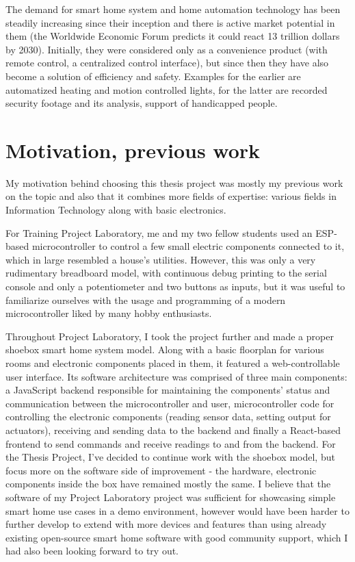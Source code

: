 The demand for smart home system and home automation technology has been steadily increasing since their inception and there is active market potential in them (the Worldwide Economic Forum predicts it could react 13 trillion dollars by 2030). Initially, they were considered only as a convenience product (with remote control, a centralized control interface), but since then they have also become a solution of efficiency and safety. Examples for the earlier are automatized heating and motion controlled lights, for the latter are recorded security footage and its analysis, support of handicapped people. \cite{ChakSHS}


\section{Motivation, previous work}
My motivation behind choosing this thesis project was mostly my previous work on the topic and also that it combines more fields of expertise: various fields in Information Technology along with basic electronics.\break

For Training Project Laboratory, me and my two fellow students used an ESP-based microcontroller to control a few small electric components connected to it, which in large resembled a house's utilities. However, this was only a very rudimentary breadboard model, with continuous debug printing to the serial console and only a potentiometer and two buttons as inputs, but it was useful to familiarize ourselves with the usage and programming of a modern microcontroller liked by many hobby enthusiasts.\break

Throughout Project Laboratory, I took the project further and made a proper shoebox smart home system model. Along with a basic floorplan for various rooms and electronic components placed in them, it featured a web-controllable user interface. Its software architecture was comprised of three main components: a JavaScript backend responsible for maintaining the components' status and communication between the microcontroller and user, microcontroller code for controlling the electronic components (reading sensor data, setting output for actuators), receiving and sending data to the backend and finally a React-based frontend to send commands and receive readings to and from the backend. \break\break
For the Thesis Project, I've decided to continue work with the shoebox model, but focus more on the software side of improvement - the hardware, electronic components inside the box have remained mostly the same. I believe that the software of my Project Laboratory project was sufficient for showcasing simple smart home use cases in a demo environment, however would have been harder to further develop to extend with more devices and features than using already existing open-source smart home software with good community support, which I had also been looking forward to try out.

